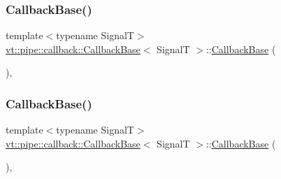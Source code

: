 \mbox{\label{structvt_1_1pipe_1_1callback_1_1_callback_base_ae96d1355aa94b4fd32469bbb9280717c}} 
\subsubsection{\texorpdfstring{Callback\+Base()}{CallbackBase()}\hspace{0.1cm}{\footnotesize\ttfamily [4/7]}}
{\footnotesize\ttfamily template$<$typename SignalT$>$ \\
\hyperlink{structvt_1_1pipe_1_1callback_1_1_callback_base}{vt\+::pipe\+::callback\+::\+Callback\+Base}$<$ SignalT $>$\+::\hyperlink{structvt_1_1pipe_1_1callback_1_1_callback_base}{Callback\+Base} (\begin{DoxyParamCaption}\item[{Callback\+Persist\+Tag\+Type}]{ }\end{DoxyParamCaption})\hspace{0.3cm}{\ttfamily [inline]}, {\ttfamily [explicit]}}

\mbox{\label{structvt_1_1pipe_1_1callback_1_1_callback_base_a18840ed75fb94811cb34c17da8703588}} 
\subsubsection{\texorpdfstring{Callback\+Base()}{CallbackBase()}\hspace{0.1cm}{\footnotesize\ttfamily [5/7]}}
{\footnotesize\ttfamily template$<$typename SignalT$>$ \\
\hyperlink{structvt_1_1pipe_1_1callback_1_1_callback_base}{vt\+::pipe\+::callback\+::\+Callback\+Base}$<$ SignalT $>$\+::\hyperlink{structvt_1_1pipe_1_1callback_1_1_callback_base}{Callback\+Base} (\begin{DoxyParamCaption}\item[{Callback\+Single\+Use\+Tag\+Type}]{ }\end{DoxyParamCaption})\hspace{0.3cm}{\ttfamily [inline]}, {\ttfamily [explicit]}}

